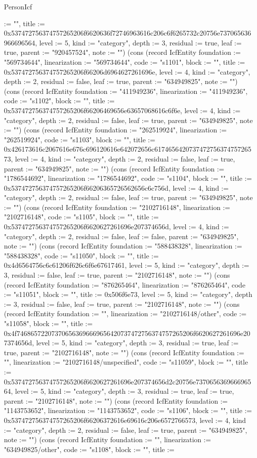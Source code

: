 \begin{lexlean}{PersonIcf}
\begin{semanticmodule}
{:= "", title := 0x537472756374757265206f6620636f72746963616c206c6f6265732c20756e737065636966696564, level := 5, kind := "category", depth := 3, residual := true, leaf := true, parent := "920457524", note := ""}) (cons (record IcfEntity {foundation := "569734644", linearization := "569734644", code := "s1101", block := "", title := 0x537472756374757265206f66206d6964627261696e, level := 4, kind := "category", depth := 2, residual := false, leaf := true, parent := "634949825", note := ""}) (cons (record IcfEntity {foundation := "411949236", linearization := "411949236", code := "s1102", block := "", title := 0x537472756374757265206f66206469656e63657068616c6f6e, level := 4, kind := "category", depth := 2, residual := false, leaf := true, parent := "634949825", note := ""}) (cons (record IcfEntity {foundation := "262519924", linearization := "262519924", code := "s1103", block := "", title := 0x426173616c2067616e676c696120616e642072656c617465642073747275637475726573, level := 4, kind := "category", depth := 2, residual := false, leaf := true, parent := "634949825", note := ""}) (cons (record IcfEntity {foundation := "1786544692", linearization := "1786544692", code := "s1104", block := "", title := 0x537472756374757265206f66206365726562656c6c756d, level := 4, kind := "category", depth := 2, residual := false, leaf := true, parent := "634949825", note := ""}) (cons (record IcfEntity {foundation := "2102716148", linearization := "2102716148", code := "s1105", block := "", title := 0x537472756374757265206f6620627261696e207374656d, level := 4, kind := "category", depth := 2, residual := false, leaf := false, parent := "634949825", note := ""}) (cons (record IcfEntity {foundation := "588438328", linearization := "588438328", code := "s11050", block := "", title := 0x4d6564756c6c61206f626c6f6e67617461, level := 5, kind := "category", depth := 3, residual := false, leaf := true, parent := "2102716148", note := ""}) (cons (record IcfEntity {foundation := "876265464", linearization := "876265464", code := "s11051", block := "", title := 0x506f6e73, level := 5, kind := "category", depth := 3, residual := false, leaf := true, parent := "2102716148", note := ""}) (cons (record IcfEntity {foundation := "", linearization := "2102716148/other", code := "s11058", block := "", title := 0x4f746865722073706563696669656420737472756374757265206f6620627261696e207374656d, level := 5, kind := "category", depth := 3, residual := true, leaf := true, parent := "2102716148", note := ""}) (cons (record IcfEntity {foundation := "", linearization := "2102716148/unspecified", code := "s11059", block := "", title := 0x537472756374757265206f6620627261696e207374656d2c20756e737065636966696564, level := 5, kind := "category", depth := 3, residual := true, leaf := true, parent := "2102716148", note := ""}) (cons (record IcfEntity {foundation := "1143753652", linearization := "1143753652", code := "s1106", block := "", title := 0x537472756374757265206f66206372616e69616c206e6572766573, level := 4, kind := "category", depth := 2, residual := false, leaf := true, parent := "634949825", note := ""}) (cons (record IcfEntity {foundation := "", linearization := "634949825/other", code := "s1108", block := "", title := }
\end{semanticmodule}
\end{lexlean}

